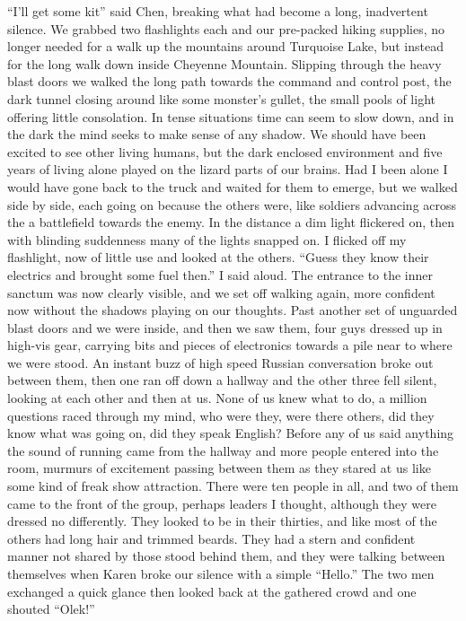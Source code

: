 \documentclass[a4paper]{article}
\begin{document}
“I’ll get some kit” said Chen, breaking what had become a long, inadvertent silence. We grabbed two flashlights each and our pre-packed hiking supplies, no longer needed for a walk up the mountains around Turquoise Lake, but instead for the long walk down inside Cheyenne Mountain.
Slipping through the heavy blast doors we walked the long path towards the command and control post, the dark tunnel closing around like some monster’s gullet, the small pools of light offering little consolation. In tense situations time can seem to slow down, and in the dark the mind seeks to make sense of any shadow. We should have been excited to see other living humans, but the dark enclosed environment and five years of living alone played on the lizard parts of our brains. Had I been alone I would have gone back to the truck and waited for them to emerge, but we walked side by side, each going on because the others were, like soldiers advancing across the a battlefield towards the enemy.
In the distance a dim light flickered on, then with blinding suddenness many of the lights snapped on. I flicked off my flashlight, now of little use and looked at the others.
“Guess they know their electrics and brought some fuel then.” I said aloud.
The entrance to the inner sanctum was now clearly visible, and we set off walking again, more confident now without the shadows playing on our thoughts. Past another set of unguarded blast doors and we were inside, and then we saw them, four guys dressed up in high-vis gear, carrying bits and pieces of electronics towards a pile near to where we were stood. An instant buzz of high speed Russian conversation broke out between them, then one ran off down a hallway and the other three fell silent, looking at each other and then at us.
None of us knew what to do, a million questions raced through my mind, who were they, were there others, did they know what was going on, did they speak English? Before any of us said anything the sound of running came from the hallway and more people entered into the room, murmurs of excitement passing between them as they stared at us like some kind of freak show attraction. There were ten people in all, and two of them came to the front of the group, perhaps leaders I thought, although they were dressed no differently. They looked to be in their thirties, and like most of the others had long hair and trimmed beards. They had a stern and confident manner not shared by those stood behind them, and they were talking between themselves when Karen broke our silence with a simple “Hello.”
The two men exchanged a quick glance then looked back at the gathered crowd and one shouted “Olek!”
\end{document}
